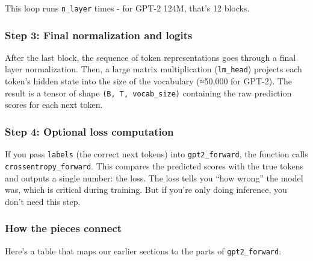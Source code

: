 \documentclass[
  letterpaper,
  DIV=11,
  numbers=noendperiod]{scrreprt}
\begin{document}
This loop runs \texttt{n\_layer} times - for GPT-2 124M, that's 12
blocks.

\subsubsection{Step 3: Final normalization and
logits}\label{step-3-final-normalization-and-logits}

After the last block, the sequence of token representations goes through
a final layer normalization. Then, a large matrix multiplication
(\texttt{lm\_head}) projects each token's hidden state into the size of
the vocabulary (≈50,000 for GPT-2). The result is a tensor of shape
\texttt{(B,\ T,\ vocab\_size)} containing the raw prediction scores for
each next token.

\subsubsection{Step 4: Optional loss
computation}\label{step-4-optional-loss-computation}

If you pass \texttt{labels} (the correct next tokens) into
\texttt{gpt2\_forward}, the function calls
\texttt{crossentropy\_forward}. This compares the predicted scores with
the true tokens and outputs a single number: the loss. The loss tells
you ``how wrong'' the model was, which is critical during training. But
if you're only doing inference, you don't need this step.

\subsubsection{How the pieces connect}\label{how-the-pieces-connect}

Here's a table that maps our earlier sections to the parts of
\texttt{gpt2\_forward}:
\end{document}
